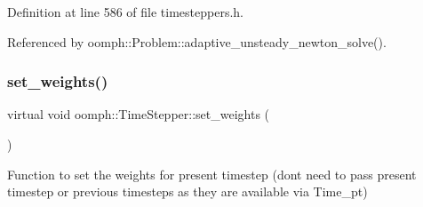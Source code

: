 Definition at line 586 of file timesteppers.\+h.



Referenced by oomph\+::\+Problem\+::adaptive\+\_\+unsteady\+\_\+newton\+\_\+solve().

\mbox{\label{classoomph_1_1TimeStepper_a028fa3a8d3c6db6b0ddf580cb0468d55}} 
\subsubsection{\texorpdfstring{set\+\_\+weights()}{set\_weights()}}
{\footnotesize\ttfamily virtual void oomph\+::\+Time\+Stepper\+::set\+\_\+weights (\begin{DoxyParamCaption}{ }\end{DoxyParamCaption})\hspace{0.3cm}{\ttfamily [pure virtual]}}



Function to set the weights for present timestep (don\textquotesingle{}t need to pass present timestep or previous timesteps as they are available via Time\+\_\+pt) 



